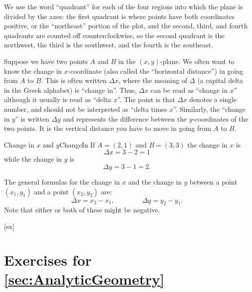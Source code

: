 We use the word ``quadrant'' for each of the four regions into which
the plane is divided by the axes: the first quadrant is where points
have both coordinates positive, or the ``northeast'' portion of the
plot, and the second, third, and fourth quadrants are counted off
counterclockwise, so the second quadrant is the northwest, the third
is the southwest, and the fourth is the southeast.

Suppose we have two points $A$ and $B$ in the $(x,y)$-plane.
We often want to know the change in $x$-coordinate (also called the
``horizontal distance'') in going from $A$ to $B$.  This is often
written $\Delta x$, where the meaning of $\Delta$ (a capital delta in
the Greek alphabet) is ``change in''. Thus, $\Delta x$ can be read as
``change in $x$'' although it usually is read as ``delta $x$''. The
point is that $\Delta x$ denotes a single number, and should not be
interpreted as ``delta times $x$''. Similarly, the ``change in $y$'' is written $\Delta y$
and represents the difference between the $y$-coordinates of the 
two points. It is the vertical distance you have to move in going from $A$ to $B$.

\begin{example}{Change in $x$ and $y$}{ChangeIn}\label{ChangeIn}
	If $A=(2,1)$ and $B=(3,3)$ the change in $x$ is
	$$\Delta x=3-2=1$$
	while the change in $y$ is
	$$\Delta y= 3-1=2.$$
	\vspace{-0.5cm}
\end{example}

The general formulas for the change in $x$ and the change in $y$ 
between a point $(x_1,y_1)$ and a point $(x_2,y_2)$ are:
$$
\Delta x=x_2-x_1,\qquad\qquad\Delta y=y_2-y_1.
$$
Note that either or both of these might be negative.




		

[ex]
\section*{Exercises for \ref{sec:AnalyticGeometry}}

